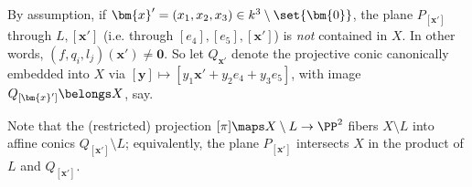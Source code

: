 \documentclass[12pt]{report}
\begin{document}



By assumption, if $\bm{x}'=(x_1,x_2,x_3)\in k^3\setminus\set{\bm{0}}$,
the plane $P_{[\bm{x}']}$ through $L,[\bm{x}']$ (i.e. through $[e_4],[e_5],[\bm{x}']$)
is \emph{not} contained in $X$.
In other words, $(f,q_i,l_j)(\bm{x}')\neq\bm{0}$.
So let $Q_{\bm{x}'}$ denote the projective conic
canonically embedded into $X$ via $[\bm{y}]\mapsto [y_1\bm{x}'+y_2e_4+y_3e_5]$,
with image $Q_{[\bm{x}']}\belongs X$, say.

Note that the (restricted) projection $[\pi]\maps X\setminus L\to\PP^2$ fibers $X\setminus L$ into affine conics $Q_{[\bm{x}']}\setminus L$;
equivalently, the plane $P_{[\bm{x}']}$ intersects $X$ in the product of $L$ and $Q_{[\bm{x}']}$.


\end{document}
